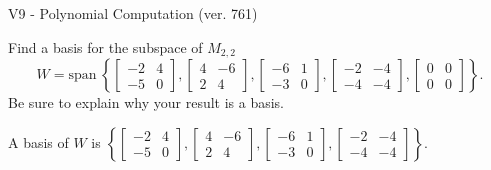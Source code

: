 \begin{exercise}
  \begin{exerciseTitle}V9 - Polynomial Computation (ver. 761)\end{exerciseTitle}
  \begin{exerciseStatement}
    Find a basis for the subspace of \(M_{2,2}\) 
\[W=\mathrm{span}\ \left\{\left[\begin{array}{cc}
-2 & 4 \\
-5 & 0
\end{array}\right] , \left[\begin{array}{cc}
4 & -6 \\
2 & 4
\end{array}\right] , \left[\begin{array}{cc}
-6 & 1 \\
-3 & 0
\end{array}\right] , \left[\begin{array}{cc}
-2 & -4 \\
-4 & -4
\end{array}\right] , \left[\begin{array}{cc}
0 & 0 \\
0 & 0
\end{array}\right]\right\}.\]
 Be sure to explain why your result is a basis.


  \end{exerciseStatement}
  \begin{exerciseAnswer}
   A basis of \(W\) is  \(\left\{\left[\begin{array}{cc}
-2 & 4 \\
-5 & 0
\end{array}\right] , \left[\begin{array}{cc}
4 & -6 \\
2 & 4
\end{array}\right] , \left[\begin{array}{cc}
-6 & 1 \\
-3 & 0
\end{array}\right] , \left[\begin{array}{cc}
-2 & -4 \\
-4 & -4
\end{array}\right]\right\}\).
  


  \end{exerciseAnswer}
\end{exercise}